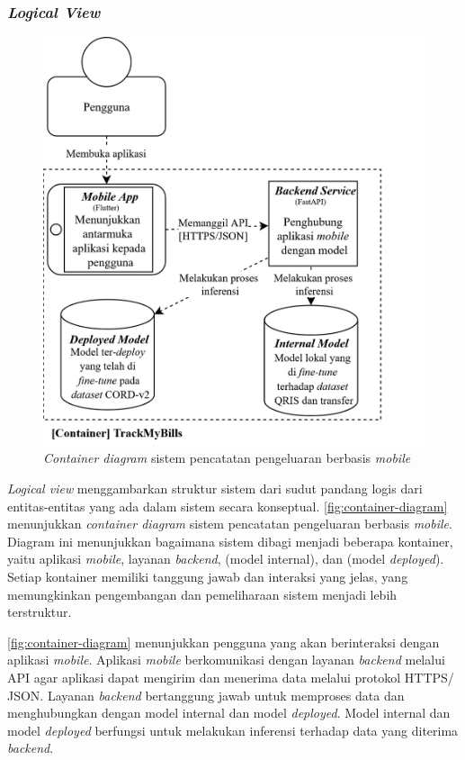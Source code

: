\newpage
\subsubsection{\emph{Logical View}}
\label{subsubsec:logical-view}

\begin{figure}[htbp]
    \centering
    \includegraphics[width=.8\textwidth]{images/container-diagram.png}
    \caption{\emph{Container diagram} sistem pencatatan pengeluaran berbasis \emph{mobile}}
    \label{fig:container-diagram}
\end{figure}

\emph{Logical view} menggambarkan struktur sistem dari sudut pandang logis dari entitas-entitas yang ada dalam sistem secara konseptual. \autoref{fig:container-diagram} menunjukkan \emph{container diagram} sistem pencatatan pengeluaran berbasis \emph{mobile}. Diagram ini menunjukkan bagaimana sistem dibagi menjadi beberapa kontainer, yaitu aplikasi \emph{mobile}, layanan \emph{backend}, \donutqristf{} (model internal), dan \donutcord{} (model \emph{deployed}). Setiap kontainer memiliki tanggung jawab dan interaksi yang jelas, yang memungkinkan pengembangan dan pemeliharaan sistem menjadi lebih terstruktur.

\autoref{fig:container-diagram} menunjukkan pengguna yang akan berinteraksi dengan aplikasi \emph{mobile}. Aplikasi \emph{mobile} berkomunikasi dengan layanan \emph{backend} melalui API agar aplikasi dapat mengirim dan menerima data melalui protokol HTTPS/ JSON. Layanan \emph{backend} bertanggung jawab untuk memproses data dan menghubungkan dengan model internal dan model \emph{deployed}. Model internal dan model \emph{deployed} berfungsi untuk melakukan inferensi terhadap data yang diterima \emph{backend}.


